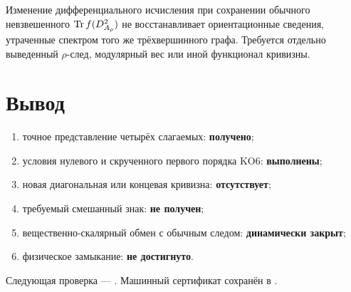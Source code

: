 \begin{nogocriterion}
Изменение дифференциального исчисления при сохранении обычного невзвешенного
\(\operatorname{Tr} f(D_{A_\rho}^2)\) не восстанавливает ориентационные сведения,
утраченные спектром того же трёхвершинного графа. Требуется отдельно
выведенный \(\rho\)-след, модулярный вес или иной функционал кривизны.
\end{nogocriterion}

\section{Вывод}

\begin{protocol}
\begin{enumerate}
 \item точное представление четырёх слагаемых: \textbf{получено};
 \item условия нулевого и скрученного первого порядка KO6:
 \textbf{выполнены};
 \item новая диагональная или концевая кривизна: \textbf{отсутствует};
 \item требуемый смешанный знак: \textbf{не получен};
 \item вещественно-скалярный обмен с обычным следом:
 \textbf{динамически закрыт};
 \item физическое замыкание: \textbf{не достигнуто}.
\end{enumerate}
\end{protocol}

Следующая проверка --- .
Машинный сертификат сохранён в
.